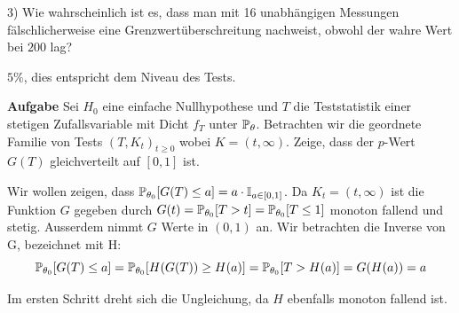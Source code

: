3) Wie wahrscheinlich ist es, dass man mit 16 unabhängigen Messungen fälschlicherweise eine Grenzwertüberschreitung nachweist, obwohl der wahre Wert bei $200$ lag?

$5\%$, dies entspricht dem Niveau des Tests.

\hrulefill

\textbf{Aufgabe}
Sei $H_0$ eine einfache Nullhypothese und $T$ die Teststatistik einer stetigen Zufallsvariable mit Dicht $f_T$ unter $\mathbb{P}_\theta$. Betrachten wir die geordnete Familie von Tests $(T, K_t)_{t \geq 0}$ wobei $K = (t, \infty)$. Zeige, dass der $p$-Wert $G(T)$ gleichverteilt auf $[0,1]$ ist. \smallskip

Wir wollen zeigen, dass $\mathbb{P}_{\theta_0}[G(T) \leq a] = a \cdot \mathbb I_{a \in [0,1]}$. Da $K_t = (t, \infty)$ ist die Funktion $G$ gegeben durch $G(t) = \mathbb{P}_{\theta_0}[T > t] = \mathbb{P}_{\theta_0}[T \leq 1]$ monoton fallend und stetig. Ausserdem nimmt $G$ Werte in $(0,1)$ an. Wir betrachten die Inverse von G, bezeichnet mit H:
$$\mathbb{P}_{\theta_0}[G(T) \leq a] = \mathbb{P}_{\theta_0}[H(G(T)) \geq H(a)] = \mathbb{P}_{\theta_0}[T > H(a)] = G(H(a)) = a$$

Im ersten Schritt dreht sich die Ungleichung, da $H$ ebenfalls monoton fallend ist.

